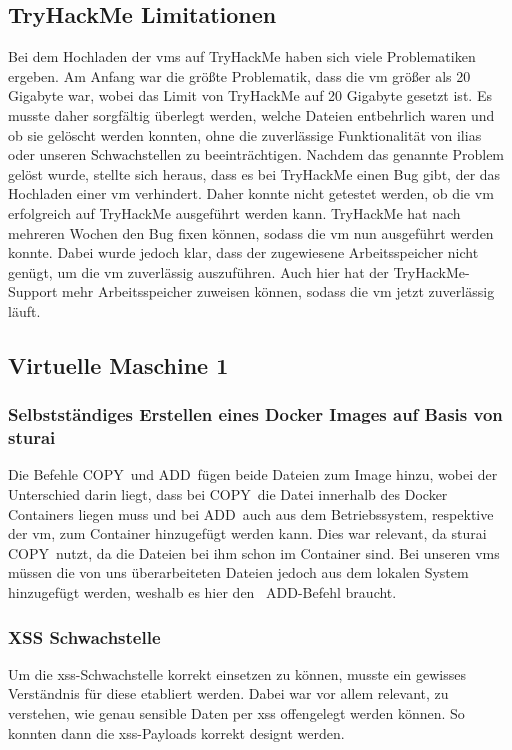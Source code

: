 \documentclass[10pt, a4paper,onecolumn ,titlepage]{article}
\begin{document}
    \subsection{TryHackMe Limitationen}
    \label{subsec:lessonslearnedTHM}
    Bei dem Hochladen der \ac{vm}s auf TryHackMe haben sich viele Problematiken ergeben.
    Am Anfang war die größte Problematik, dass die \ac{vm} größer als 20 Gigabyte war, wobei das Limit von TryHackMe auf 20 Gigabyte gesetzt ist.
    Es musste daher sorgfältig überlegt werden, welche Dateien entbehrlich waren und ob sie gelöscht werden konnten, ohne die zuverlässige Funktionalität von \ac{ilias} oder unseren Schwachstellen zu beeinträchtigen.
    Nachdem das genannte Problem gelöst wurde, stellte sich heraus, dass es bei TryHackMe einen Bug gibt, der das Hochladen einer \ac{vm} verhindert.
    Daher konnte nicht getestet werden, ob die \ac{vm} erfolgreich auf TryHackMe ausgeführt werden kann.
    TryHackMe hat nach mehreren Wochen den Bug fixen können, sodass die \ac{vm} nun ausgeführt werden konnte.
    Dabei wurde jedoch klar, dass der zugewiesene Arbeitsspeicher nicht genügt, um die \ac{vm} zuverlässig auszuführen.
    Auch hier hat der TryHackMe-Support mehr Arbeitsspeicher zuweisen können, sodass die \ac{vm} jetzt zuverlässig läuft.

    \subsection{Virtuelle Maschine 1}
    \label{subsec:vm1lessonslearned}

    \subsubsection{Selbstständiges Erstellen eines Docker Images auf Basis von sturai}
    \label{subsubsec:lessonslearnedDocker}
    Die Befehle \glqq COPY\grqq\ und \glqq ADD\grqq\ fügen beide Dateien zum Image hinzu, wobei der Unterschied darin liegt, dass bei \glqq COPY\grqq\ die Datei innerhalb des Docker Containers liegen muss und bei \glqq ADD\grqq\ auch aus dem Betriebssystem, respektive der \ac{vm}, zum Container hinzugefügt werden kann.
    Dies war relevant, da sturai \glqq COPY\grqq\ nutzt, da die Dateien bei ihm schon im Container sind.
    Bei unseren \ac{vm}s müssen die von uns überarbeiteten Dateien jedoch aus dem lokalen System hinzugefügt werden, weshalb es hier den \glqq\ ADD\grqq-Befehl braucht.

    \subsubsection{XSS Schwachstelle}
    \label{subsubsec:lessonslearnedXSS}
    Um die \ac{xss}-Schwachstelle korrekt einsetzen zu können, musste ein gewisses Verständnis für diese etabliert werden.
    Dabei war vor allem relevant, zu verstehen, wie genau sensible Daten per \ac{xss} offengelegt werden können.
    So konnten dann die \ac{xss}-Payloads korrekt designt werden.
\end{document}
